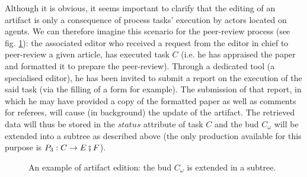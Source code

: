 Although it is obvious, it seems important to clarify that the editing of an artifact is only a consequence of process tasks' execution by actors located on agents. We can therefore imagine this scenario for the peer-review process (see fig. \ref{chap3:fig:artifact-edition}): the associated editor who received a request from the editor in chief to peer-review a given article, has executed task $C$ (i.e. he has appraised the paper and formatted it to prepare the peer-review). Through a dedicated tool (a specialised editor), he has been invited to submit a report on the execution of the said task (via the filling of a form for example). The submission of that report, in which he may have provided a copy of the formatted paper as well as comments for referees, will cause (in background) the update of the artifact. The retrieved data will thus be stored in the $status$ attribute of task $C$ and the bud $C_\omega$ will be extended into a subtree as described above (the only production available for this purpose is $P_{3}: C\rightarrow E\fatsemi F$).
\begin{figure}[ht!]
	\noindent
	\caption{An example of artifact edition: the bud $C_\omega$ is extended in a subtree.}
	\label{chap3:fig:artifact-edition}
\end{figure}
